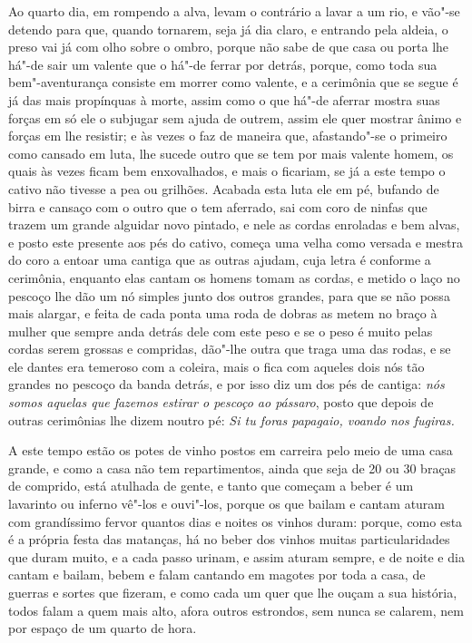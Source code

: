  Ao quarto dia, em rompendo a alva, levam o contrário a lavar a um rio,
e vão"-se detendo para que, quando tornarem, seja já dia claro, e
entrando pela aldeia, o preso vai já com olho sobre o ombro, porque não
sabe de que casa ou porta lhe há"-de sair um valente que o há"-de ferrar
por detrás, porque, como toda sua bem"-aventurança consiste em morrer
como valente, e a cerimônia que se segue é já das mais propínquas à
morte, assim como o que há"-de aferrar mostra suas forças em só ele o
subjugar sem ajuda de outrem, assim ele quer mostrar ânimo e forças em
lhe resistir; e às vezes o faz de maneira que, afastando"-se o primeiro
como cansado em luta, lhe sucede outro que se tem por mais valente
homem, os quais às vezes ficam bem enxovalhados, e mais o ficariam, se
já a este tempo o cativo não tivesse a pea ou grilhões. Acabada esta
luta ele em pé, bufando de birra e cansaço com o outro que o tem
aferrado, sai com coro de ninfas que trazem um grande alguidar novo
pintado, e nele as cordas enroladas e bem alvas, e posto este presente
aos pés do cativo, começa uma velha como versada e mestra do coro a
entoar uma cantiga que as outras ajudam, cuja letra é conforme a
cerimônia, enquanto elas cantam os homens tomam as cordas, e metido o
laço no pescoço lhe dão um nó simples junto dos outros grandes, para
que se não possa mais alargar, e feita de cada ponta uma roda de dobras
as metem no braço à mulher que sempre anda detrás dele com este peso e
se o peso é muito pelas cordas serem grossas e compridas, dão"-lhe outra
que traga uma das rodas, e se ele dantes era temeroso com a coleira,
mais o fica com aqueles dois nós tão grandes no pescoço da banda
detrás, e por isso diz um dos pés de cantiga: \textit{nós somos aquelas
que fazemos estirar o pescoço ao pássaro}, posto que depois de outras
cerimônias lhe dizem noutro pé: \textit{Si tu foras papagaio, voando nos fugiras.} 

 A este tempo estão os potes de vinho postos em carreira pelo
meio de uma casa grande, e como a casa não tem repartimentos, ainda
que seja de 20 ou 30 braças de comprido, está atulhada de gente, e 
tanto que começam a beber é um lavarinto ou inferno vê"-los e ouvi"-los,
porque os que bailam e cantam aturam com grandíssimo fervor quantos
dias e noites os vinhos duram: porque, como esta é a própria festa das
matanças, há no beber dos vinhos muitas particularidades que duram
muito, e a cada passo urinam, e assim aturam sempre, e de noite e dia
cantam e bailam, bebem e falam cantando em magotes por toda a casa, de
guerras e sortes que fizeram, e como cada um quer que lhe ouçam a sua
história, todos falam a quem mais alto, afora outros estrondos, sem
nunca se calarem, nem por espaço de um quarto de hora.

